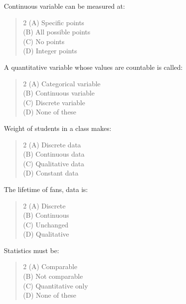 \documentclass[11pt,a4paper]{article}
\begin{document}
\begin{mcqlist}
\item Continuous variable can be measured at:
\begin{quote}\begin{multicols}{2}
\noindent (A) Specific points \\
(B) All possible points \\
(C) No points \\
(D) Integer points
\end{multicols}\end{quote}

\item A quantitative variable whose values are countable is called:
\begin{quote}\begin{multicols}{2}
\noindent (A) Categorical variable \\
(B) Continuous variable \\
(C) Discrete variable \\
(D) None of these
\end{multicols}\end{quote}

\item Weight of students in a class makes:
\begin{quote}\begin{multicols}{2}
\noindent (A) Discrete data \\
(B) Continuous data \\
(C) Qualitative data \\
(D) Constant data
\end{multicols}\end{quote}

\item The lifetime of fans, data is:
\begin{quote}\begin{multicols}{2}
\noindent (A) Discrete \\
(B) Continuous \\
(C) Unchanged \\
(D) Qualitative
\end{multicols}\end{quote}

\item Statistics must be:
\begin{quote}\begin{multicols}{2}
\noindent (A) Comparable \\
(B) Not comparable \\
(C) Quantitative only \\
(D) None of these
\end{multicols}\end{quote}


\end{mcqlist}
\end{document}
